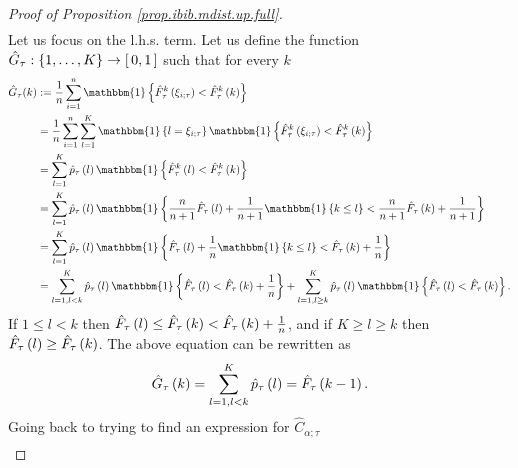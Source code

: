\documentclass[11pt]{article}
\begin{document}
\begin{proof}[Proof of Proposition \ref{prop.ibib.mdist.up.full}]
\begin{align*}
\end{align*}
%
%
%
Let us focus on the l.h.s. term. Let us define the function $\hat{G}_{\tau} : \left\{ 1, \ldots, K \right\} \to \left[\, 0, 1 \,\right]$
such that for every $k$
\begin{align*}
    \hat{G}_{\tau}(k)
    &
    :=
    \frac{1}{n}
    \sum_{i=1}^{n}
    \mathbbm{1}
    \brac{
        \hat{F}_{\tau}^{k} \paren{\xi_{i; \tau}}
        < \hat{F}_{\tau}^{k} \paren{k}
    }
    \\
    &
    =
    \frac{1}{n}
    \sum_{i=1}^{n}
    \sum_{l=1}^{K}
    \mathbbm{1}
    \brac{l = \xi_{i; \tau}}
    \mathbbm{1}
    \brac{
        \hat{F}_{\tau}^{k} \paren{\xi_{i; \tau}}
        < \hat{F}_{\tau}^{k} \paren{k}
    }
    \\
    &
    =
    \sum_{l=1}^{K}
    \hat{p}_{\tau}\paren{l}
    \mathbbm{1}
    \brac{
        \hat{F}_{\tau}^{k} \paren{l}
        < \hat{F}_{\tau}^{k} \paren{k}
    }
    \\
    &
    =
    \sum_{l=1}^{K}
    \hat{p}_{\tau}\paren{l}
    \mathbbm{1}
    \brac{
        \frac{n}{n+1}
        \hat{F}_{\tau}\paren{l}
        + \frac{1}{n+1} \mathbbm{1} \brac{k \leq l}
        <
        \frac{n}{n+1} 
        \hat{F}_{\tau}\paren{k}
        + \frac{1}{n+1}
    }
    \\
    &
    =
    \sum_{l=1}^{K}
    \hat{p}_{\tau}\paren{l}
    \mathbbm{1}
    \brac{
        \hat{F}_{\tau}\paren{l}
        + \frac{1}{n} \mathbbm{1} \brac{k \leq l}
        < \hat{F}_{\tau}\paren{k}
        + \frac{1}{n}
    }
    \\
    &
    =
    \sum_{l=1, l < k}^{K}
    \hat{p}_{\tau}\paren{l}
    \mathbbm{1}
    \brac{
        \hat{F}_{\tau}\paren{l}
        < \hat{F}_{\tau}\paren{k}
        + \frac{1}{n}
    }
    +
    \sum_{l=1, l \geq  k}^{K}
    \hat{p}_{\tau}\paren{l}
    \mathbbm{1}
    \brac{
        \hat{F}_{\tau}\paren{l}
        < \hat{F}_{\tau}\paren{k}
    }.
\end{align*}
%
%
%
If $1 \leq l < k$ then $\hat{F}_{\tau}\left( l \right) \leq \hat{F}_{\tau}\left( k \right)<\hat{F}_{\tau}\left( k \right) + \frac{1}{n}$,
and if $K \geq l \geq k$ then $\hat{F}_{\tau}\left( l \right) \geq \hat{F}_{\tau}\left( k \right)$.
The above equation can be rewritten as
\begin{align*}
    \hat{G}_{\tau}\left( k \right) 
    = \sum_{l=1, l < k}^{K}
    \hat{p}_{\tau} \left( l \right)
    = \hat{F}_{\tau} \left( k-1 \right).
\end{align*}
%
%
%
Going back to trying to find an expression for $\hat{C}_{\alpha; \tau}$
\begin{align*}

\end{align*}
\end{proof}
\end{document}
